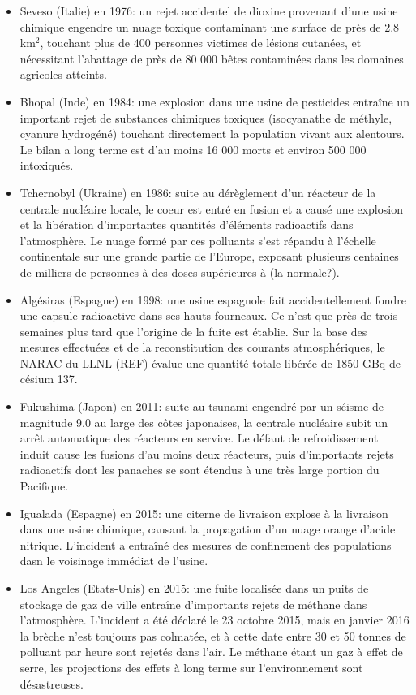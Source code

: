 	\begin{itemize}
		\item Seveso (Italie) en 1976: un rejet accidentel de dioxine provenant d'une usine chimique engendre un nuage toxique contaminant une surface de près de 2.8 km$^2$, touchant plus de 400 personnes victimes de lésions cutanées, et nécessitant l'abattage de près de 80 000 bêtes contaminées dans les domaines agricoles atteints. 
		\item Bhopal (Inde) en 1984: une explosion dans une usine de pesticides entraîne un important rejet de substances chimiques toxiques (isocyanathe de méthyle, cyanure hydrogéné) touchant directement la population vivant aux alentours. Le bilan a long terme est d'au moins 16 000 morts et environ 500 000 intoxiqués.
		\item Tchernobyl (Ukraine) en 1986: suite au dérèglement d'un réacteur de la centrale nucléaire locale, le coeur est entré en fusion et a causé une explosion et la libération d'importantes quantités d'éléments radioactifs dans l'atmosphère. Le nuage formé par ces polluants s'est répandu à l'échelle continentale sur une grande partie de l'Europe, exposant plusieurs centaines de milliers de personnes à des doses supérieures à (la normale?).
		\item Algésiras (Espagne) en 1998: une usine espagnole fait accidentellement fondre une capsule radioactive dans ses hauts-fourneaux. Ce n'est que près de trois semaines plus tard que l'origine de la fuite est établie. Sur la base des mesures effectuées et de la reconstitution des courants atmosphériques, le NARAC du LLNL (REF) évalue une quantité totale libérée de 1850 GBq de césium 137.
		\item Fukushima (Japon) en 2011: suite au tsunami engendré par un séisme de magnitude 9.0 au large des côtes japonaises, la centrale nucléaire subit un arrêt automatique des réacteurs en service. Le défaut de refroidissement induit cause les fusions d'au moins deux réacteurs, puis d'importants rejets radioactifs dont les panaches se sont étendus à une très large portion du Pacifique.
		\item Igualada (Espagne) en 2015: une citerne de livraison explose à la livraison dans une usine chimique, causant la propagation d'un nuage orange d'acide nitrique. L'incident a entraîné des mesures de confinement des populations dasn le voisinage immédiat de l'usine.
		\item Los Angeles (Etats-Unis) en 2015: une fuite localisée dans un puits de stockage de gaz de ville entraîne d'importants rejets de méthane dans l'atmosphère. L'incident a été déclaré le 23 octobre 2015, mais en janvier 2016 la brèche n'est toujours pas colmatée, et à cette date entre 30 et 50 tonnes de polluant par heure sont rejetés dans l'air. Le méthane étant un gaz à effet de serre, les projections des effets à long terme sur l'environnement sont désastreuses. \\
	\end{itemize}
	
